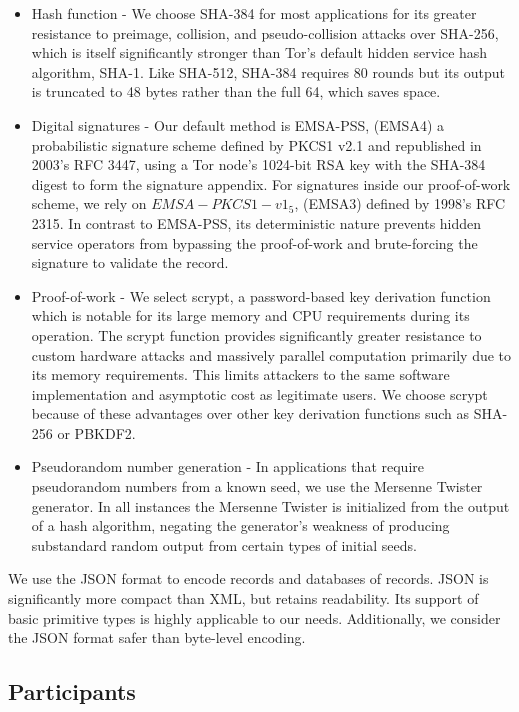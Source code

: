 \begin{itemize}
	\item Hash function - We choose SHA-384 for most applications for its greater resistance to preimage, collision, and pseudo-collision attacks over SHA-256, which is itself significantly stronger than Tor's default hidden service hash algorithm, SHA-1. Like SHA-512, SHA-384 requires 80 rounds but its output is truncated to 48 bytes rather than the full 64, which saves space.
	\item Digital signatures - Our default method is EMSA-PSS, (EMSA4) a probabilistic signature scheme defined by PKCS1 v2.1 and republished in 2003's RFC 3447, using a Tor node's 1024-bit RSA key with the SHA-384 digest to form the signature appendix. For signatures inside our proof-of-work scheme, we rely on $EMSA-PKCS1-v1_5$, (EMSA3) defined by 1998's RFC 2315. In contrast to EMSA-PSS, its deterministic nature prevents hidden service operators from bypassing the proof-of-work and brute-forcing the signature to validate the record.
	\item Proof-of-work - We select scrypt, a password-based key derivation function which is notable for its large memory and CPU requirements during its operation. The scrypt function provides significantly greater resistance to custom hardware attacks and massively parallel computation primarily due to its memory requirements. This limits attackers to the same software implementation and asymptotic cost as legitimate users.\cite{percival2009stronger} We choose scrypt because of these advantages over other key derivation functions such as SHA-256 or PBKDF2.
	\item Pseudorandom number generation - In applications that require pseudorandom numbers from a known seed, we use the Mersenne Twister generator. In all instances the Mersenne Twister is initialized from the output of a hash algorithm, negating the generator's weakness of producing substandard random output from certain types of initial seeds.
\end{itemize}

We use the JSON format to encode records and databases of records. JSON is significantly more compact than XML, but retains readability. Its support of basic primitive types is highly applicable to our needs. Additionally, we consider the JSON format safer than byte-level encoding.

\subsection{Participants}

